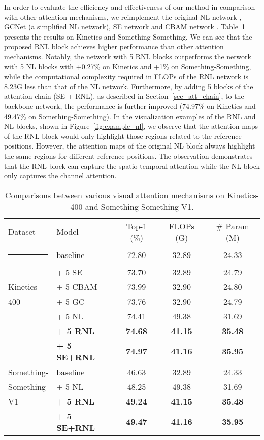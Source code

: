 \documentclass[a4paper,conference]{IEEEtran}
\makeatletter
\newcommand{\thickhline}{\noalign {\ifnum 0=`}\fi \hrule height 1pt
    \futurelet \reserved@a \@xhline
}
\makeatother
\begin{document}
 In order to evaluate the efficiency and effectiveness of our method in comparison with other attention mechanisms, we reimplement the original NL network \cite{wang2018non}, GCNet \cite{cao2019gcnet} (a simplified NL network), SE network \cite{Hu_2018_CVPR} and CBAM network \cite{woo2018cbam}.  Table~\ref{table:comparisons_attention_mechanisms} presents the results on Kinetics and Something-Something. We can see that the proposed RNL block achieves higher performance than other attention mechanisms. Notably, the network with 5 RNL blocks outperforms the network with 5 NL blocks with +0.27\% on Kinetics and +1\% on Something-Something, while the computational complexity required in FLOPs of the RNL network is 8.23G less than that of the NL network. Furthermore, by adding 5 blocks of the attention chain (SE + RNL), as described in Section~\ref{sec_att_chain}, to the backbone network, the performance is further improved (74.97\% on Kinetics and 49.47\% on Something-Something). In the visualization examples of the RNL and NL blocks, shown in Figure~\ref{fig:example_nl}, we observe that the attention maps of the RNL block would only highlight those regions related to the reference positions. However, the attention maps of the original NL block always highlight the same regions for different reference positions. The observation demonstrates that the RNL block can capture the spatio-temporal attention while the NL block only captures the channel attention. 
 
  \begin{table}
\caption{Comparisons between various visual attention mechanisms on Kinetics-400 and Something-Something V1.}
\label{table:comparisons_attention_mechanisms}
\centering
\setlength{\tabcolsep}{4pt}
\begin{tabular}{l|lccc}
Dataset & Model & Top-1 (\%)  & FLOPs (G)  & \# Param (M) \\
\thickhline
&baseline & 72.80 & 32.89 & 24.33\\
&+ 5 SE & 73.70 & 32.89 &24.79\\
Kinetics-&+ 5 CBAM & 73.99 & 32.90 & 24.80 \\
400&+ 5 GC & 73.76 & 32.90 & 24.79\\
&+ 5 NL  & 74.41 & 49.38 & 31.69\\
&\textbf{+ 5 RNL} & \textbf{74.68} & \textbf{41.15}& \textbf{35.48}\\
&\textbf{+ 5 SE+RNL} & \textbf{74.97} & \textbf{41.16}& \textbf{35.95}\\
\hline
\hline
Something-& baseline & 46.63 & 32.89 & 24.33\\
Something & + 5 NL & 48.25 & 49.38 & 31.69 \\
V1& \textbf{+ 5 RNL} & \textbf{49.24} & \textbf{41.15}& \textbf{35.48}\\
&\textbf{+ 5 SE+RNL} & \textbf{49.47} & \textbf{41.16}& \textbf{35.95}\\
\end{tabular}
\end{table}
 
\end{document}
